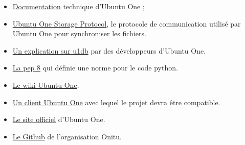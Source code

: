 \begin{itemize}
\renewcommand{\labelitemi}{$\bullet$}
\item \href{https://wiki.ubuntu.com/UbuntuOne/TechnicalDetails}{Documentation} technique d'Ubuntu One ;
\item \href{http://bazaar.launchpad.net/~ubuntuone-control-tower/ubuntuone-storage-protocol/trunk/files}{Ubuntu One Storage Protocol}, le protocole de communication utilisé par Ubuntu One pour synchroniser les fichiers.
\item \href{https://github.com/onitu/Epitech.EIP/wiki/Discussion-du-03-03-13-avec-Chipaca-sur-\%23u1db}{Un explication sur u1db} par des développeurs d'Ubuntu One.
\item \href{http://www.python.org/dev/peps/pep-0008/}{La pep 8} qui définie une
norme pour le code python.
\item \href{https://wiki.ubuntu.com/UbuntuOne}{Le wiki Ubuntu One}.
\item
\href{http://bazaar.launchpad.net/~ubuntuone-control-tower/ubuntuone-client-gnome/trunk/files}{Un
client Ubuntu One} avec lequel le projet devra être compatible.
\item \href{https://one.ubuntu.com/dashboard/}{Le site officiel} d'Ubuntu One.
\item \href{https://github.com/onitu/}{Le Github} de l'organisation Onitu.
\end{itemize}
